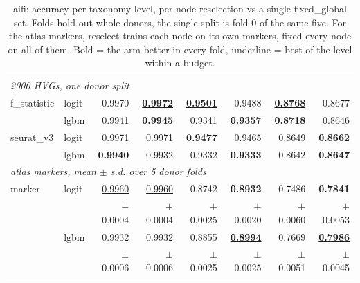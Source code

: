 \begin{table}[t]
\begin{tabular}{llrrrrrr}
\midrule
\multicolumn{8}{l}{\emph{2000 HVGs, one donor split}} \\
f\_statistic & logit & 0.9970 & \underline{\textbf{0.9972}} & \underline{\textbf{0.9501}} & 0.9488 & \underline{\textbf{0.8768}} & 0.8677 \\
 & lgbm & 0.9941 & \textbf{0.9945} & 0.9341 & \textbf{0.9357} & \textbf{0.8718} & 0.8646 \\
\addlinespace
seurat\_v3 & logit & 0.9971 & 0.9971 & \textbf{0.9477} & 0.9465 & 0.8649 & \textbf{0.8662} \\
 & lgbm & \textbf{0.9940} & 0.9932 & 0.9332 & \textbf{0.9333} & 0.8642 & \textbf{0.8647} \\
\midrule
\multicolumn{8}{l}{\emph{atlas markers, mean $\pm$ s.d. over 5 donor folds}} \\
marker & logit & \underline{0.9960} & \underline{0.9960} & 0.8742 & \textbf{0.8932} & 0.7486 & \textbf{0.7841} \\
 &  & {\scriptsize$\pm$0.0004} & {\scriptsize$\pm$0.0004} & {\scriptsize$\pm$0.0025} & {\scriptsize$\pm$0.0020} & {\scriptsize$\pm$0.0060} & {\scriptsize$\pm$0.0053} \\[1pt]
 & lgbm & 0.9932 & 0.9932 & 0.8855 & \underline{\textbf{0.8994}} & 0.7669 & \underline{\textbf{0.7986}} \\
 &  & {\scriptsize$\pm$0.0006} & {\scriptsize$\pm$0.0006} & {\scriptsize$\pm$0.0025} & {\scriptsize$\pm$0.0025} & {\scriptsize$\pm$0.0051} & {\scriptsize$\pm$0.0045} \\[1pt]
\bottomrule
\end{tabular}
\caption{aifi: accuracy per taxonomy level, per-node reselection vs a single fixed\_global set. Folds hold out whole donors, the single split is fold 0 of the same five. For the atlas markers, reselect trains each node on its own markers, fixed every node on all of them. Bold = the arm better in every fold, underline = best of the level within a budget.}
\label{tab:comparison-aifi-accuracy}
\end{table}
